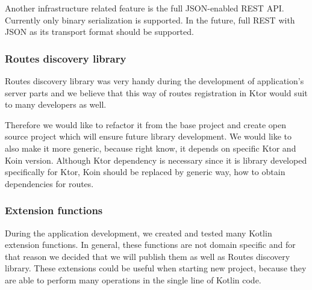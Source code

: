 Another infrastructure related feature is the full JSON-enabled REST API.
Currently only binary serialization is supported.
In the future, 
full REST with JSON as its transport format should be supported.

\subsubsection{Routes discovery library}
Routes discovery library was very handy during the development of application's server parts 
and we believe that this way of routes registration in Ktor would suit to many developers as well.

Therefore we would like to refactor it from the base project 
and create open source project which will ensure future library development.
We would like to also make it more generic,
because right know, 
it depends on specific Ktor and Koin version.
Although Ktor dependency is necessary
since it is library developed specifically for Ktor,
Koin should be replaced by generic way, 
how to obtain dependencies for routes.

\subsubsection{Extension functions}
During the application development,
we created and tested many Kotlin extension functions.
In general, these functions are not domain specific
and for that reason we decided that we will publish them as well as Routes discovery library.
These extensions could be useful when starting new project,
because they are able to perform many operations in the single line of Kotlin code.